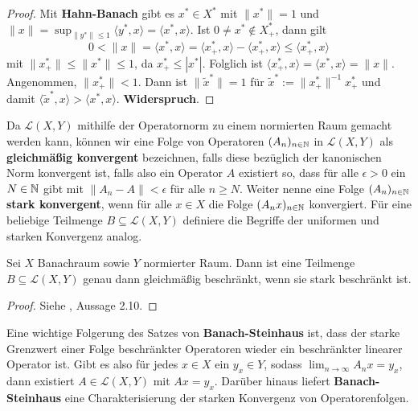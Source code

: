 \begin{proof}
Mit \textbf{Hahn-Banach} gibt es  $x^*\in X^*$ mit $\|x^*\| =1$ und  $\|x\| = \sup_{\|y^*\|\leq 1}\langle y^*, x\rangle = \langle x^*, x\rangle$. Ist $0\neq x^*\not\in X_+^*$, dann gilt
\begin{equation*}
0 < \|x\|=\langle x^*, x\rangle = \langle x_+^*, x\rangle - \langle x_+^*, x\rangle\leq \langle x_+^*, x\rangle
\end{equation*}
mit $\|x_+^*\|\leq \|x^*\|\leq 1$, da $x_+^*\leq |x^*|$. Folglich ist $\langle x_+^*, x\rangle = \langle x^*, x \rangle = \|x\|$. Angenommen,  $\|x^*_+\| < 1$. Dann ist $\|\widetilde{x}^*\|=1$ für $\widetilde{x}^*:= \|x_+^*\|^{-1} x_+^*$  und damit $\langle \widetilde{x}^*, x\rangle> \langle x^*, x\rangle$. \textbf{Widerspruch}. 
\end{proof}


Da $\mathcal L(X, Y)$ mithilfe der Operatornorm zu einem normierten Raum gemacht werden kann, können wir eine Folge von Operatoren $(A_n)_{n\in\mathbb{N}}$ in $\mathcal L(X,Y)$ als \textbf{gleichmäßig konvergent} bezeichnen, falls diese bezüglich der kanonischen Norm konvergent ist, falls also ein Operator $A$ existiert so, dass für alle $\epsilon> 0$ ein $N\in\mathbb{N}$ gibt mit $\|A_n-A\|< \epsilon $ für alle $n\geq N$. Weiter nenne eine Folge $(A_n)_{n\in\mathbb{N}}$  \textbf{stark konvergent}, wenn für alle $x\in X$ die Folge $(A_nx)_{n\in\mathbb{N}}$ konvergiert. Für eine beliebige Teilmenge $B\subseteq\mathcal L(X,Y)$ definiere die Begriffe der uniformen und starken Konvergenz analog.

\begin{fsatz}
Sei $X$ Banachraum sowie $Y$ normierter Raum. Dann ist eine Teilmenge $B\subseteq \mathcal L(X, Y)$ genau dann gleichmäßig beschränkt, wenn sie stark beschränkt ist.
\end{fsatz}

\begin{proof}
Siehe \cite{banasiak_arlotti_2006}, Aussage 2.10. 
\end{proof}

Eine wichtige Folgerung des Satzes von \textbf{Banach-Steinhaus} ist, dass der starke Grenzwert einer Folge beschränkter Operatoren wieder ein beschränkter linearer Operator ist. Gibt es also für jedes $x\in X$ ein $y_x\in Y$, sodass $\lim_{n\to\infty} A_n x=y_x$, dann existiert $A\in\mathcal L(X,Y)$ mit $Ax= y_x$. Darüber hinaus liefert \textbf{Banach-Steinhaus} eine Charakterisierung der starken Konvergenz von Operatorenfolgen. 


